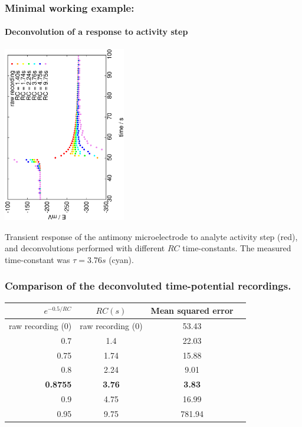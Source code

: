 \documentclass{beamer}
\begin{document}
\begin{frame}
\frametitle{Minimal working example:}
\framesubtitle{Deconvolution of a response to activity step}
\begin{center}
\includegraphics[width=0.4\textwidth, angle=-90]{transient3.eps}
\end{center}

Transient response of the antimony microelectrode to analyte activity step (red), and deconvolutions performed with different $RC$ time-constants. The measured time-constant was $\tau = 3.76 s$ (cyan).
\end{frame}

\begin{frame}
\frametitle{Comparison of the deconvoluted time-potential recordings.}
\begin{table}
                \label{table:rc}
                \centering
                \begin{tabular}{r c c c}
                        $e^{-0.5/RC}$ & $RC (s)$ & Mean squared error \\
                        \hline
                        raw recording (0) & raw recording (0) & 53.43 \\
                        0.7 & 1.4 & 22.03  \\
                        0.75 & 1.74 & 15.88  \\
                        0.8 & 2.24 & 9.01 \\
                        \textbf{0.8755} & \textbf{3.76} & \textbf{3.83} \\
                        0.9 & 4.75 & 16.99 \\
                        0.95 & 9.75 & 781.94 \\
                \end{tabular}
\end{table}
\end{frame}
\end{document}
